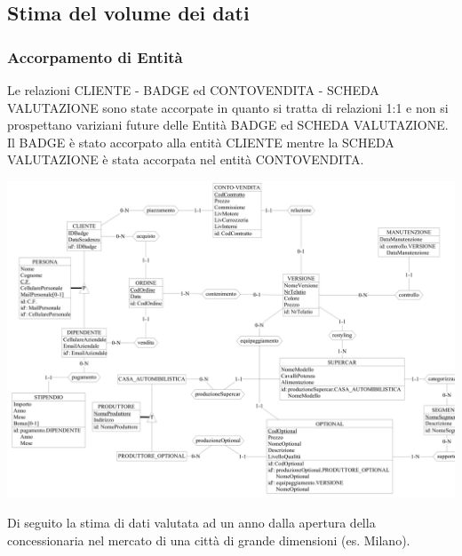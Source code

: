 \documentclass[11pt]{article}
\begin{document}
\subsection{Stima del volume dei dati}

\subsubsection*{Accorpamento di Entità}

Le relazioni CLIENTE - BADGE ed CONTOVENDITA - SCHEDA VALUTAZIONE sono
state accorpate in quanto si tratta di relazioni 1:1 e non si
prospettano variziani future delle Entità BADGE ed SCHEDA
VALUTAZIONE. Il BADGE è stato accorpato alla entità CLIENTE mentre
la SCHEDA VALUTAZIONE è stata accorpata nel entità CONTOVENDITA.

\begin{center}
    \includegraphics[scale=0.48, angle=90]{images/fullSchemes/finalAccorpamenti.png}
\end{center}

Di seguito la stima di dati valutata ad un anno dalla apertura della
concessionaria nel mercato di una città di grande dimensioni (es. Milano). 
\end{document}
